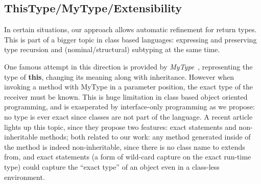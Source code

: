 

\subsection{ThisType/MyType/Extensibility}

In certain situations, our approach allows automatic refinement for return types. This is part of a bigger topic in class based languages: expressing and preserving type recursion and (nominal/structural) subtyping at the same time. 

One famous attempt in this direction is provided by
\emph{MyType}~\cite{bruce1994paradigmatic}, representing the type of
\textbf{this}, changing its meaning along with inheritance.  However when
invoking a method with MyType in a parameter position, the exact type of the
receiver must be known.  This is huge limitation in class based object oriented
programming, and is exasperated by interface-only programming as we propose: no
type is ever exact since classes are not part of the language.  A recent
article~\cite{Saito2013933} lights up this topic, since they propose two
features: exact statements  and
non-inheritable methods; both related to our work: any method generated inside
of the \Q@of@ method is indeed non-inheritable, since there is no class name to
extends from, and exact statements (a form of wild-card capture on the exact
run-time type) could capture the ``exact type'' of an object even in a
class-less environment.





